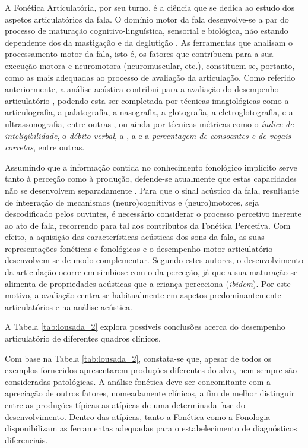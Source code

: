 \documentclass[output=paper]{LSP/langsci}
\begin{document}
A Fonética Articulatória, por seu turno, é a ciência que se dedica ao estudo dos aspetos articulatórios da fala. O domínio motor da fala desenvolve-se a par do processo de maturação cognitivo-linguística, sensorial e biológica, não estando dependente dos da mastigação e da deglutição \citep{kent2000}. As ferramentas que analisam o processamento motor da fala, isto é, os fatores que contribuem para a sua execução motora e neuromotora (neuromuscular, etc.), constituem-se, portanto, como as mais adequadas ao processo de avaliação da articulação. Como referido anteriormente, a análise acústica contribui para a avaliação do desempenho articulatório \citep{rielysmith2003}, podendo esta ser completada por técnicas imagiológicas como a articulografia, a palatografia, a nasografia, a glotografia, a eletroglotografia, e a ultrassonografia, entre outras \citep{berti2013,llisterri2014}, ou ainda por técnicas métricas como o \textit{índice de inteligibilidade}, o \textit{débito verbal}, a \textit{}, a \textit{} e a \textit{percentagem de consoantes e de vogais corretas}, entre outras.

Assumindo que a informação contida no conhecimento fonológico implícito serve tanto à perceção como à produção, defende-se atualmente que estas capacidades não se desenvolvem separadamente \citep{kent2000,peperkampdupoux2002,smith2006,smith2010}. Para que o sinal acústico da fala, resultante de integração de mecanismos (neuro)cognitivos e (neuro)motores, seja descodificado pelos ouvintes, é necessário considerar o processo percetivo inerente ao ato de fala, recorrendo para tal aos contributos da Fonética Percetiva.  Com efeito, a aquisição das características acústicas dos sons da fala, as suas representações fonéticas e fonológicas e o desempenho motor articulatório desenvolvem-se de modo complementar. Segundo estes autores, o desenvolvimento da articulação ocorre em simbiose com o da perceção, já que a sua maturação se alimenta de propriedades acústicas que a criança perceciona (\textit{ibidem}). Por este motivo, a avaliação centra-se habitualmente em aspetos predominantemente articulatórios e na análise acústica. 

A Tabela \ref{tab:lousada_2} explora possíveis conclusões acerca do desempenho articulatório de diferentes quadros clínicos.

Com base na Tabela \ref{tab:lousada_2}, constata-se que, apesar de todos os exemplos fornecidos apresentarem produções diferentes do alvo, nem sempre são consideradas patológicas. A análise fonética deve ser concomitante com a apreciação de outros fatores, nomeadamente clínicos, a fim de melhor distinguir entre as produções típicas as atípicas de uma determinada fase do desenvolvimento. Dentro das atípicas, tanto a Fonética como a Fonologia disponibilizam as ferramentas adequadas para o estabelecimento de diagnósticos diferenciais.
\end{document}
